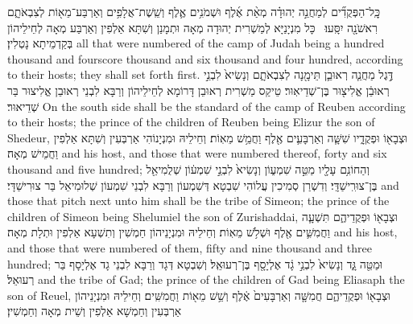 {כׇּֽל־הַפְּקֻדִ֞ים לְמַחֲנֵ֣ה יְהוּדָ֗ה מְאַ֨ת אֶ֜לֶף וּשְׁמֹנִ֥ים אֶ֛לֶף וְשֵֽׁשֶׁת־אֲלָפִ֥ים וְאַרְבַּע־מֵא֖וֹת לְצִבְאֹתָ֑ם רִאשֹׁנָ֖ה יִסָּֽעוּ׃ \setuma 
{}}
{כָּל מִנְיָנַיָּא לְמַשְׁרִית יְהוּדָה מְאָה וּתְמָנַן וְשִׁתָּא אַלְפִין וְאַרְבַּע מְאָה לְחֵילֵיהוֹן בְּקַדְמֵיתָא נָטְלִין׃}
{all that were numbered of the camp of Judah being a hundred thousand and fourscore thousand and six thousand and four hundred, according to their hosts; they shall set forth first.}{}
{דֶּ֣גֶל מַחֲנֵ֧ה רְאוּבֵ֛ן תֵּימָ֖נָה לְצִבְאֹתָ֑ם וְנָשִׂיא֙ לִבְנֵ֣י רְאוּבֵ֔ן אֱלִיצ֖וּר בֶּן־שְׁדֵיאֽוּר׃}
{טֵיקַס מַשְׁרִית רְאוּבֵן דָּרוֹמָא לְחֵילֵיהוֹן וְרַבָּא לִבְנֵי רְאוּבֵן אֱלִיצוּר בַּר שְׁדֵיאוּר׃}
{On the south side shall be the standard of the camp of Reuben according to their hosts; the prince of the children of Reuben being Elizur the son of Shedeur,}{}
{וּצְבָא֖וֹ וּפְקֻדָ֑יו שִׁשָּׁ֧ה וְאַרְבָּעִ֛ים אֶ֖לֶף וַחֲמֵ֥שׁ מֵאֽוֹת׃}
{וְחֵילֵיהּ וּמִנְיָנוֹהִי אַרְבְּעִין וְשִׁתָּא אַלְפִין וַחֲמֵישׁ מְאָה׃}
{and his host, and those that were numbered thereof, forty and six thousand and five hundred;}{}
{וְהַחוֹנִ֥ם עָלָ֖יו מַטֵּ֣ה שִׁמְע֑וֹן וְנָשִׂיא֙ לִבְנֵ֣י שִׁמְע֔וֹן שְׁלֻמִיאֵ֖ל בֶּן־צוּרִֽישַׁדָּֽי׃}
{וְדִשְׁרַן סְמִיכִין עֲלוֹהִי שִׁבְטָא דְּשִׁמְעוֹן וְרַבָּא לִבְנֵי שִׁמְעוֹן שְׁלוּמִיאֵל בַּר צוּרִישַׁדָּי׃}
{and those that pitch next unto him shall be the tribe of Simeon; the prince of the children of Simeon being Shelumiel the son of Zurishaddai,}{}
{וּצְבָא֖וֹ וּפְקֻדֵיהֶ֑ם תִּשְׁעָ֧ה וַחֲמִשִּׁ֛ים אֶ֖לֶף וּשְׁלֹ֥שׁ מֵאֽוֹת׃}
{וְחֵילֵיהּ וּמִנְיָנֵיהוֹן חַמְשִׁין וְתִשְׁעָא אַלְפִין וּתְלָת מְאָה׃}
{and his host, and those that were numbered of them, fifty and nine thousand and three hundred;}{}
{וּמַטֵּ֖ה גָּ֑ד וְנָשִׂיא֙ לִבְנֵ֣י גָ֔ד אֶלְיָסָ֖ף בֶּן־רְעוּאֵֽל׃}
{וְשִׁבְטָא דְּגָד וְרַבָּא לִבְנֵי גָד אֶלְיָסָף בַּר רְעוּאֵל׃}
{and the tribe of Gad; the prince of the children of Gad being Eliasaph the son of Reuel,}{}
{וּצְבָא֖וֹ וּפְקֻדֵיהֶ֑ם חֲמִשָּׁ֤ה וְאַרְבָּעִים֙ אֶ֔לֶף וְשֵׁ֥שׁ מֵא֖וֹת וַחֲמִשִּֽׁים׃}
{וְחֵילֵיהּ וּמִנְיָנֵיהוֹן אַרְבְּעִין וְחַמְשָׁא אַלְפִין וְשֵׁית מְאָה וְחַמְשִׁין׃}
